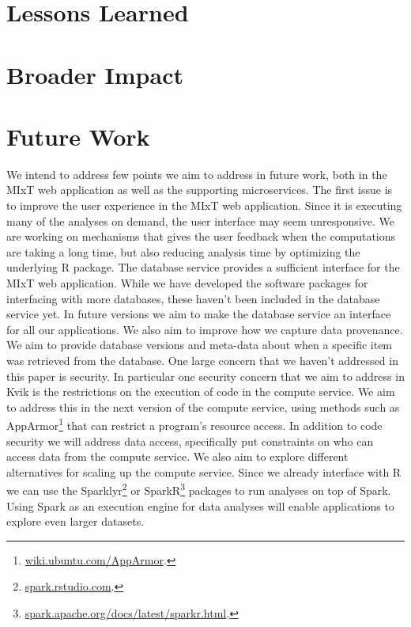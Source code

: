\section{Lessons Learned}
\section{Broader Impact}
\section{Future Work}
We intend to address few points we aim to address in future work, both in the
MIxT web application as well as the supporting microservices.  The first issue
is to improve the user experience in the MIxT web application.  Since it is
executing many of the analyses on demand, the user interface may seem
unresponsive. We are working on mechanisms that gives the user feedback when the
computations are taking a long time, but also reducing analysis time by
optimizing the underlying R package.  The database service provides a sufficient
interface for the MIxT web application. While we have developed the software
packages for interfacing with more databases, these haven't been included in the
database service yet. In future versions we aim to make the database service an
interface for all our applications.  We also aim to improve how we capture data
provenance. We aim to provide database versions and meta-data about when a
specific item was retrieved from the database.  One large concern that we
haven't addressed in this paper is security. In particular one security concern
that we aim to address in Kvik is the restrictions on the execution of code in
the compute service. We aim to address this in the next version of the compute
service, using methods such as
AppArmor\footnote{\url{wiki.ubuntu.com/AppArmor}.} that can restrict a program's
resource access. In addition to code security we will address data access,
specifically put constraints on who can access data from the compute service.
We also aim to explore different alternatives for scaling up the compute
service.  Since we already interface with R we can use the
Sparklyr\footnote{\url{spark.rstudio.com}.} or
SparkR\footnote{\url{spark.apache.org/docs/latest/sparkr.html}.} packages to run
analyses on top of Spark.\cite{zaharia2010spark} Using Spark as an execution
engine for data analyses will enable applications to explore even larger
datasets.
